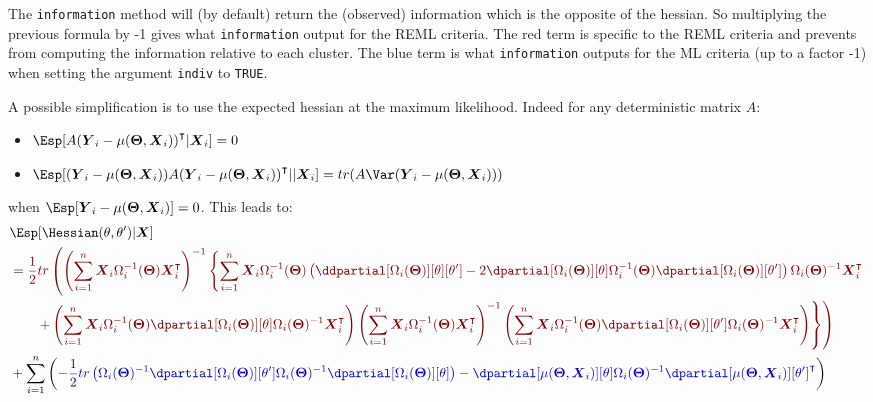 \documentclass[12pt]{article}
\newcommand{\darkblue}{blue!80!black}
\newcommand{\darkred}{red!50!black}
\newcommand\trans[1]{{#1}^\intercal}%
\newcommand{\param}{\Theta}
\newcommand{\Vparam}{\boldsymbol{\param}}
\newcommand{\VX}{\boldsymbol{X}}
\newcommand{\VY}{\boldsymbol{Y}}
\begin{document}
\bigskip

The \texttt{information} method will (by default) return the (observed)
information which is the opposite of the hessian. So multiplying the
previous formula by -1 gives what \texttt{information} output for the REML
criteria. The red term is specific to the REML criteria and prevents
from computing the information relative to each cluster. The blue term
is what \texttt{information} outputs for the ML criteria (up to a factor -1)
when setting the argument \texttt{indiv} to \texttt{TRUE}.

\bigskip

A possible simplification is to use the expected hessian at the maximum likelihood. Indeed for
any deterministic matrix \(A\):
\begin{itemize}
\item \(\Esp[A \trans{(\VY_i-\mu(\Vparam,\VX_i))}|\VX_i] = 0\)
\item \(\Esp[(\VY_i-\mu(\Vparam,\VX_i)) A \trans{(\VY_i-\mu(\Vparam,\VX_i))}||\VX_i] = tr(A \Var(\VY_i-\mu(\Vparam,\VX_i)))\)
\end{itemize}
when \(\Esp[\VY_i-\mu(\Vparam,\VX_i)]=0\). This leads to:
\begin{align}
 & \Esp[\Hessian(\theta,\theta^{\prime})|\VX] \notag\\ 
 &= \textcolor{\darkred}{ \frac{1}{2} tr \left( \left(\sum_{i=1}^n \VX_i \Omega_i^{-1}(\Vparam) \trans{\VX}_i\right)^{-1}  \left\{ \sum_{i=1}^n \VX_i \Omega_i^{-1}(\Vparam) \left( \ddpartial[\Omega_i(\Vparam)][\theta][\theta^{\prime}] - 2 \dpartial[\Omega_i(\Vparam)][\theta]  \Omega_i^{-1}(\Vparam) \dpartial[\Omega_i(\Vparam)][\theta^{\prime}]\right) \Omega_i(\Vparam)^{-1} \trans{\VX}_i \right.  \right.} \notag \\
 & \textcolor{\darkred}{ \left. \left. \qquad +  \left(\sum_{i=1}^n \VX_i \Omega_i^{-1}(\Vparam) \dpartial[\Omega_i(\Vparam)][\theta] \Omega_i(\Vparam)^{-1} \trans{\VX}_i\right) \left(\sum_{i=1}^n \VX_i \Omega_i^{-1}(\Vparam) \trans{\VX}_i \right)^{-1} \left(\sum_{i=1}^n \VX_i \Omega_i^{-1}(\Vparam) \dpartial[\Omega_i(\Vparam)][\theta^{\prime}] \Omega_i(\Vparam)^{-1} \trans{\VX}_i\right) \right\} \right) } \notag\\
 & + \sum_{i=1}^n \left( \textcolor{\darkblue}{
- \frac{1}{2} tr\left(\Omega_i(\Vparam)^{-1} \dpartial[\Omega_i(\Vparam)][\theta^{\prime}] \Omega_i(\Vparam)^{-1} \dpartial[\Omega_i(\Vparam)][\theta]\right)
 - \dpartial[\mu(\Vparam,\VX_i)][\theta] \Omega_i(\Vparam)^{-1} \trans{\dpartial[\mu(\Vparam,\VX_i)][\theta^{\prime}]}
 } \right) \label{eq:expectedInfo} 
\end{align}
\end{document}
